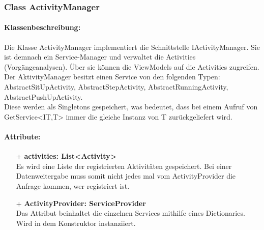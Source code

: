 \documentclass[a4paper,12pt]{article}
\begin{document}
	\subsubsection{Class ActivityManager}
	\paragraph{Klassenbeschreibung:}
	Die Klasse ActivityManager implementiert die Schnittstelle IActivityManager. Sie ist demnach ein Service-Manager und verwaltet die Activities (Vorgängeanalysen). Über sie können die ViewModels auf die Activities zugreifen.\\
	Der AktivityManager besitzt einen Service von den folgenden Typen: AbstractSitUpActivity, AbstractStepActivity, AbstractRunningActivity, AbstractPushUpActivity.\\
	Diese werden als Singletons gespeichert, was bedeutet, dass bei einem Aufruf von GetService<IT,T> immer die gleiche Instanz von T zurückgeliefert wird.
	
	\paragraph{Attribute:}
	\begin{itemize}
		\item[+] \textbf{activities: List<Activity>}\\Es wird eine Liste der registrierten Aktivitäten gespeichert. Bei einer Datenweitergabe muss somit nicht jedes mal vom ActivityProvider die Anfrage kommen, wer registriert ist. 
		\item[+] \textbf{ActivityProvider: ServiceProvider}\\Das Attribut beinhaltet die einzelnen Services mithilfe eines Dictionaries. Wird in dem Konstruktor instanziiert.
	\end{itemize}
\end{document}

